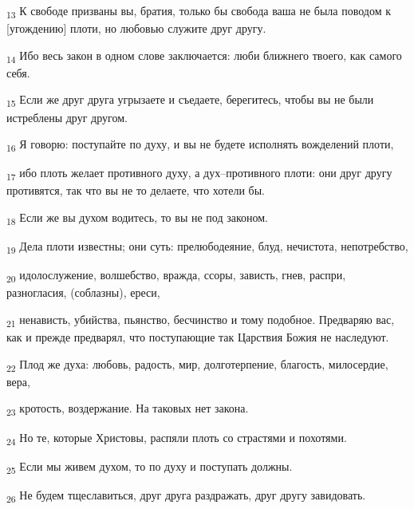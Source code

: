 \begin{tcolorbox}
\textsubscript{13} К свободе призваны вы, братия, только бы свобода ваша не была поводом к [угождению] плоти, но любовью служите друг другу.
\end{tcolorbox}
\begin{tcolorbox}
\textsubscript{14} Ибо весь закон в одном слове заключается: люби ближнего твоего, как самого себя.
\end{tcolorbox}
\begin{tcolorbox}
\textsubscript{15} Если же друг друга угрызаете и съедаете, берегитесь, чтобы вы не были истреблены друг другом.
\end{tcolorbox}
\begin{tcolorbox}
\textsubscript{16} Я говорю: поступайте по духу, и вы не будете исполнять вожделений плоти,
\end{tcolorbox}
\begin{tcolorbox}
\textsubscript{17} ибо плоть желает противного духу, а дух--противного плоти: они друг другу противятся, так что вы не то делаете, что хотели бы.
\end{tcolorbox}
\begin{tcolorbox}
\textsubscript{18} Если же вы духом водитесь, то вы не под законом.
\end{tcolorbox}
\begin{tcolorbox}
\textsubscript{19} Дела плоти известны; они суть: прелюбодеяние, блуд, нечистота, непотребство,
\end{tcolorbox}
\begin{tcolorbox}
\textsubscript{20} идолослужение, волшебство, вражда, ссоры, зависть, гнев, распри, разногласия, (соблазны), ереси,
\end{tcolorbox}
\begin{tcolorbox}
\textsubscript{21} ненависть, убийства, пьянство, бесчинство и тому подобное. Предваряю вас, как и прежде предварял, что поступающие так Царствия Божия не наследуют.
\end{tcolorbox}
\begin{tcolorbox}
\textsubscript{22} Плод же духа: любовь, радость, мир, долготерпение, благость, милосердие, вера,
\end{tcolorbox}
\begin{tcolorbox}
\textsubscript{23} кротость, воздержание. На таковых нет закона.
\end{tcolorbox}
\begin{tcolorbox}
\textsubscript{24} Но те, которые Христовы, распяли плоть со страстями и похотями.
\end{tcolorbox}
\begin{tcolorbox}
\textsubscript{25} Если мы живем духом, то по духу и поступать должны.
\end{tcolorbox}
\begin{tcolorbox}
\textsubscript{26} Не будем тщеславиться, друг друга раздражать, друг другу завидовать.
\end{tcolorbox}
